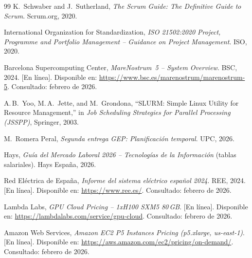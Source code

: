 \documentclass[11pt,a4paper]{article}
\begin{document}
\begin{thebibliography}{99}
K.~Schwaber and J.~Sutherland, \textit{The Scrum Guide: The Definitive Guide to Scrum}. Scrum.org, 2020.

International Organization for Standardization, \textit{ISO 21502:2020 Project, Programme and Portfolio Management -- Guidance on Project Management}. ISO, 2020.

Barcelona Supercomputing Center, \textit{MareNostrum~5 -- System Overview}. BSC, 2024. [En línea]. Disponible en: \url{https://www.bsc.es/marenostrum/marenostrum-5}. Consultado: febrero de 2026.

A.\,B.~Yoo, M.\,A.~Jette, and M.~Grondona, ``SLURM: Simple Linux Utility for Resource Management,'' in \textit{Job Scheduling Strategies for Parallel Processing (JSSPP)}, Springer, 2003.

M.~Romera Peral, \textit{Segunda entrega GEP: Planificación temporal}. UPC, 2026.

Hays, \textit{Guía del Mercado Laboral 2026 -- Tecnologías de la Información} (tablas salariales). Hays España, 2026.

Red Eléctrica de España, \textit{Informe del sistema eléctrico español 2024}. REE, 2024. [En línea]. Disponible en: \url{https://www.ree.es/}. Consultado: febrero de 2026.

Lambda Labs, \textit{GPU Cloud Pricing -- 1xH100 SXM5 80\,GB}. [En línea]. Disponible en: \url{https://lambdalabs.com/service/gpu-cloud}. Consultado: febrero de 2026.

Amazon Web Services, \textit{Amazon EC2 P5 Instances Pricing (p5.xlarge, us-east-1)}. [En línea]. Disponible en: \url{https://aws.amazon.com/ec2/pricing/on-demand/}. Consultado: febrero de 2026.

\end{thebibliography}
\end{document}
